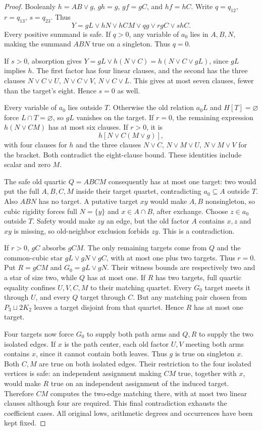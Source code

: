 \documentclass[11pt]{article}
\theoremstyle{definition}
\theoremstyle{remark}
\begin{document}
\begin{proof}
Booleanly $h=AB\vee g$, $gh=g$, $gf=gC$, and $hf=hC$. Write $q=q_{12}$, $r=q_{13}$, $s=q_{23}$. Thus
\[
 Y=gL\vee hN\vee hCM\vee qg\vee rgC\vee shC.
\]
Every positive summand is safe. If $q>0$, any variable of $a_0$ lies in $A,B,N$, making the summand $ABN$ true on a singleton. Thus $q=0$.

If $s>0$, absorption gives $Y=gL\vee h(N\vee C)=h(N\vee C\vee gL)$, since $gL$ implies $h$. The first factor has four linear clauses, and the second has the three clauses $N\vee C\vee U$, $N\vee C\vee V$, $N\vee C\vee L$. This gives at most seven clauses, fewer than the target's eight. Hence $s=0$ as well.

Every variable of $a_0$ lies outside $T$. Otherwise the old relation $a_0L$ and $H[T]=\varnothing$ force $L\cap T=\varnothing$, so $gL$ vanishes on the target. If $r=0$, the remaining expression $h(N\vee CM)$ has at most six clauses. If $r>0$, it is
\[
 h[N\vee C(M\vee g)],
\]
with four clauses for $h$ and the three clauses $N\vee C$, $N\vee M\vee U$, $N\vee M\vee V$ for the bracket. Both contradict the eight-clause bound. These identities include scalar and zero $M$.

The safe old quartic $Q=ABCM$ consequently has at most one target: two would put the full $A,B,C,M$ inside their target quartet, contradicting $a_0\subseteq A$ outside $T$. Also $ABN$ has no target. A putative target $xy$ would make $A,B$ nonsingleton, so cubic rigidity forces full $N=\{y\}$ and $x\in A\cap B$, after exchange. Choose $z\in a_0$ outside $T$. Safety would make $zy$ an edge, but the old factor $A$ contains $x,z$ and $xy$ is missing, so old-neighbor exclusion forbids $zy$. This is a contradiction.

If $r>0$, $gC$ absorbs $gCM$. The only remaining targets come from $Q$ and the common-cubic star $gL\vee gN\vee gC$, with at most one plus two targets. Thus $r=0$. Put $R=gCM$ and $G_0=gL\vee gN$. Their witness bounds are respectively two and a star of size two, while $Q$ has at most one. If $R$ has two targets, full quartic equality confines $U,V,C,M$ to their matching quartet. Every $G_0$ target meets it through $U$, and every $Q$ target through $C$. But any matching pair chosen from $P_3\sqcup2K_2$ leaves a target disjoint from that quartet. Hence $R$ has at most one target.

Four targets now force $G_0$ to supply both path arms and $Q,R$ to supply the two isolated edges. If $x$ is the path center, each old factor $U,V$ meeting both arms contains $x$, since it cannot contain both leaves. Thus $g$ is true on singleton $x$. Both $C,M$ are true on both isolated edges. Their restriction to the four isolated vertices is safe: an independent assignment making $CM$ true, together with $x$, would make $R$ true on an independent assignment of the induced target. Therefore $CM$ computes the two-edge matching there, with at most two linear clauses although four are required. This final contradiction exhausts the coefficient cases. All original lows, arithmetic degrees and occurrences have been kept fixed.
\end{proof}
\end{document}
